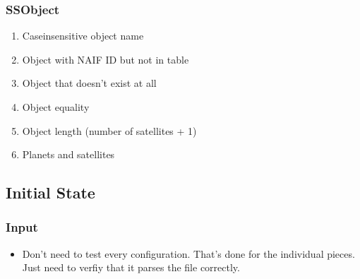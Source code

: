 \documentclass[letterpaper,10pt,english]{sphinxmanual}
\begin{document}
\subsubsection{SSObject}
\label{\detokenize{nexoclom2/TestCases:ssobject}}\begin{enumerate}
%
\item {} 
\sphinxAtStartPar
Case\sphinxhyphen{}insensitive object name

\item {} 
\sphinxAtStartPar
Object with NAIF ID but not in table

\item {} 
\sphinxAtStartPar
Object that doesn’t exist at all

\item {} 
\sphinxAtStartPar
Object equality

\item {} 
\sphinxAtStartPar
Object length (number of satellites + 1)

\item {} 
\sphinxAtStartPar
Planets and satellites

\end{enumerate}


\subsection{Initial State}
\label{\detokenize{nexoclom2/TestCases:initial-state}}

\subsubsection{Input}
\label{\detokenize{nexoclom2/TestCases:input}}\begin{itemize}
\item {} 
\sphinxAtStartPar
Don’t need to test every configuration. That’s done for the individual
pieces. Just need to verfiy that it parses the file correctly.

\end{itemize}
\end{document}
